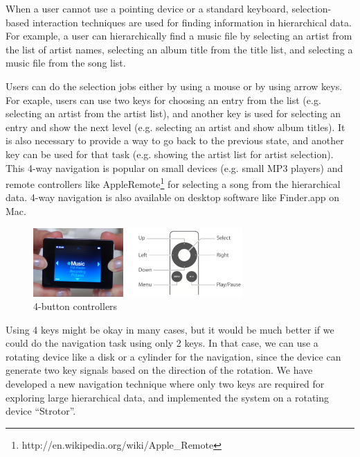 \documentclass{article}
\begin{document}
When a user cannot use a pointing device or a standard keyboard,
selection-based interaction techniques are used for
finding information in hierarchical data.
For example, a user can hierarchically find a music file by
selecting an artist from the list of artist names,
selecting an album title from the title list,
and selecting a music file from the song list.

Users can do the selection jobs either by using a mouse or by using arrow keys.
For exaple,
users can use two keys for choosing an entry from the list
(e.g. selecting an artist from the artist list),
and another key is used for selecting an entry and show the next level
(e.g. selecting an artist and show album titles).
It is also necessary to provide a way to go back to the previous state, and
another key can be used for that task
(e.g. showing the artist list for artist selection).
%
This 4-way navigation is popular on small devices (e.g. small MP3 players) and remote controllers like AppleRemote\footnote{http://en.wikipedia.org/wiki/Apple\_Remote}
for selecting a song from the hierarchical data.
4-way navigation is also available on desktop software like Finder.app on Mac.

\begin{figure}[H]
\centerline{\includegraphics[width=80mm,bb=0 0 547 179]{figures/4buttons.png}}
\caption{4-button controllers}
\label{u10}
\end{figure}



Using 4 keys might be okay in many cases, but it would be much better
if we could do the navigation task using only 2 keys.
In that case, we can use a rotating device like a disk or a cylinder for the navigation,
since the device can generate two key signals based on the direction of the rotation.
%
We have developed a new navigation technique where only two keys are required
for exploring large hierarchical data, and implemented the system on
a rotating device ``Strotor''.
\end{document}
